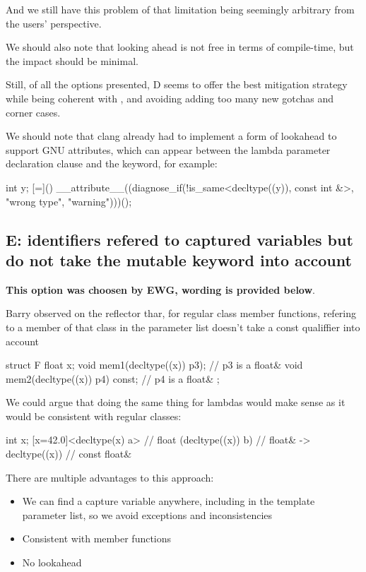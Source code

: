 \documentclass{wg21}
\begin{document}
And we still have this problem of that limitation being seemingly arbitrary from the users' perspective.

We should also note that looking ahead is not free in terms of compile-time, but the impact should be minimal.

Still, of all the options presented, D seems to offer the best mitigation strategy while being
coherent with , and avoiding adding too many new gotchas and corner cases.

We should note that clang already had to implement a form of lookahead to support GNU attributes, which can appear between the
lambda parameter declaration clause and the  keyword, for example:

\begin{colorblock}
int y;
[=]() __attribute__((diagnose_if(!is_same<decltype((y)), const int &>, "wrong type", "warning"))){}();
\end{colorblock}


\subsection{E: identifiers refered to captured variables but do not take the mutable keyword into account}

\textbf{This option was choosen by EWG, wording is provided below}.

Barry observed on the reflector thar, for regular class member functions, refering to a member of that class in the parameter list
doesn't take a const qualiffier into account

\begin{colorblock}
struct F {
    float x;
    void mem1(decltype((x)) p3);       // p3 is a float&
    void mem2(decltype((x)) p4) const; // p4 is a float&
};
\end{colorblock}

We could argue that doing the same thing for lambdas would make sense as it would be consistent with regular classes:


\begin{colorblock}
int x;
[x=42.0]<decltype(x) a> // float
(decltype((x)) b)       // float&
-> decltype((x))        // const float&
\end{colorblock}


There are multiple advantages to this approach:

\begin{itemize}
\item We can find a capture variable anywhere, including in the template parameter list, so we avoid exceptions and inconsistencies
\item Consistent with member functions
\item No lookahead
\end{itemize}
\end{document}
